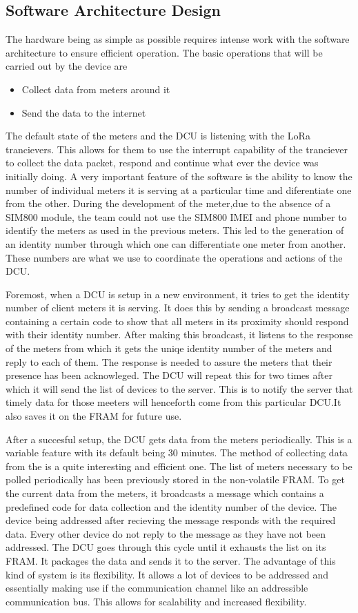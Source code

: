 \subsection{Software Architecture Design}
The hardware being as simple as possible requires intense work with the software architecture to ensure efficient operation. The basic operations that will be carried out by the device are
\begin{itemize}
\item Collect data from meters around it
\item Send the data to the internet
\end{itemize} 
The default state of the meters and the DCU is listening with the LoRa trancievers. This allows for them to use the interrupt capability of the tranciever to collect the data packet, respond and continue what ever the device was initially doing.
A very important feature of the software is the ability to know the number of individual meters it is serving at a particular time and  diferentiate one from the other. During the development of the meter,due to the absence of a SIM800 module, the team could not use the SIM800 IMEI and phone number to identify the meters as used in the previous meters. This led to the generation of an identity number through which one can differentiate one meter from another. These numbers are what we use to coordinate the operations and actions of the DCU.

Foremost, when a DCU is setup in a new environment, it tries to get the identity number of client meters it is serving. It does this by sending a broadcast message containing a certain code to show that all meters in its proximity should respond with their identity number. After making this broadcast, it listens to the response of the meters from which it gets the uniqe identity number of the meters and reply to each of them. The response is needed to assure the meters that their presence has been acknowleged. The DCU will repeat this for two times after which it will send the list of devices to the server. This is to notify the server that timely data for those meeters will henceforth come from this particular DCU.It also saves it on the FRAM for future use.

 
After a succesful setup, the DCU gets data from the meters periodically. This is a variable feature with its default being 30 minutes. The method of collecting data from the is a quite interesting and efficient one. The list of meters necessary to be polled periodically has been previously stored in the non-volatile FRAM. To get the current data from the meters, it broadcasts a message which contains a predefined code for data collection and the identity number of the device. The device being addressed after recieving the message responds with the required data. Every other device do not reply to the message as they have not been addressed.  The DCU goes through this cycle until it exhausts the list on its FRAM. It packages the data and sends it to the server. The advantage of this kind of system is its flexibility. It allows a lot of devices to be addressed and essentially making use if the communication channel like an addressible communication bus. This allows for scalability and increased flexibility.


